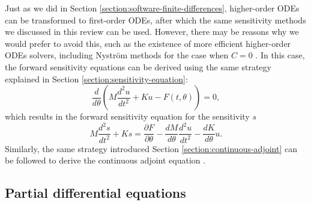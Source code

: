 Just as we did in Section \ref{section:software-finite-differences}, higher-order ODEs can be transformed to first-order ODEs, after which the same sensitivity methods we discussed in this review can be used. 
However, there may be reasons why we would prefer to avoid this, such as the existence of more efficient higher-order ODEs solvers, including Nystr\"{o}m methods for the case when $C = 0$ \cite{Butcher_Wanner_1996, hairer-solving-1}. 
In this case, the forward sensitivity equations can be derived using the same strategy explained in Section \ref{section:sensitivity-equation}: 
\begin{equation}
    \frac{d}{d\theta} 
    \left(
    M \frac{d^2 u}{dt^2}
    + 
    K u
    -
    F(t, \theta)
    \right) = 0,
\end{equation}
which results in the forward sensitivity equation for the sensitivity $s$
\begin{equation}
    M \frac{d^2 s}{dt^2}
    + 
    K s
    = 
    \frac{\partial F}{\partial \theta} 
    - 
    \frac{dM}{d\theta} \frac{d^2 u}{dt^2}
    - 
    \frac{dK}{d\theta} u. 
\end{equation}
Similarly, the same strategy introduced Section \ref{section:continuous-adjoint} can be followed to derive the continuous adjoint equation \cite{kang2006review}. 



\subsection{Partial differential equations}




